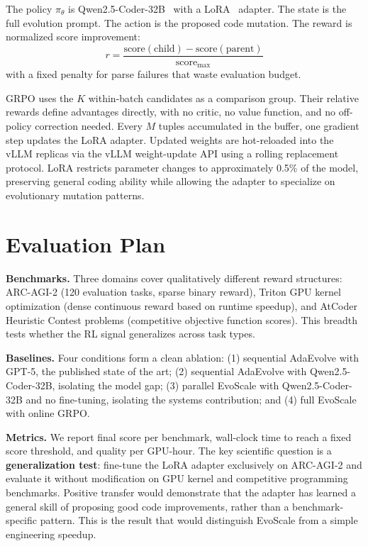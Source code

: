 \documentclass{article}
\begin{document}
The policy $\pi_\theta$ is Qwen2.5-Coder-32B~\cite{qwen25coder} with a
LoRA~\cite{lora} adapter. The state is the full evolution prompt. The
action is the proposed code mutation. The reward is normalized score
improvement:
\[
  r = \frac{\text{score}(\text{child}) - \text{score}(\text{parent})}
           {\text{score}_{\max}}
\]
with a fixed penalty for parse failures that waste evaluation budget.

GRPO uses the $K$ within-batch candidates as a comparison group. Their
relative rewards define advantages directly, with no critic, no
value function, and no off-policy correction needed. Every $M$ tuples
accumulated in the buffer, one gradient step updates the LoRA adapter.
Updated weights are hot-reloaded into the vLLM replicas via the vLLM
weight-update API using a rolling replacement protocol. LoRA restricts
parameter changes to approximately 0.5\% of the model, preserving
general coding ability while allowing the adapter to specialize on
evolutionary mutation patterns.

\section*{Evaluation Plan}

\textbf{Benchmarks.} Three domains cover qualitatively different reward
structures: ARC-AGI-2 (120 evaluation tasks, sparse binary reward),
Triton GPU kernel optimization (dense continuous reward based on runtime
speedup), and AtCoder Heuristic Contest problems (competitive objective
function scores). This breadth tests whether the RL signal generalizes
across task types.

\textbf{Baselines.} Four conditions form a clean ablation: (1) sequential
AdaEvolve with GPT-5, the published state of the art; (2) sequential
AdaEvolve with Qwen2.5-Coder-32B, isolating the model gap; (3) parallel
EvoScale with Qwen2.5-Coder-32B and no fine-tuning, isolating the systems
contribution; and (4) full EvoScale with online GRPO.

\textbf{Metrics.} We report final score per benchmark, wall-clock time to
reach a fixed score threshold, and quality per GPU-hour. The key scientific
question is a \textbf{generalization test}: fine-tune the LoRA adapter
exclusively on ARC-AGI-2 and evaluate it without modification on GPU
kernel and competitive programming benchmarks. Positive transfer would
demonstrate that the adapter has learned a general skill of proposing good
code improvements, rather than a benchmark-specific pattern. This is the
result that would distinguish EvoScale from a simple engineering speedup.
\end{document}
